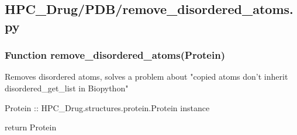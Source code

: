 

\subsection{HPC\_Drug/PDB/remove\_disordered\_atoms.py}

    \subsubsection{Function remove\_disordered\_atoms(Protein)}

        Removes disordered atoms, solves a problem about "copied atoms don't inherit disordered\_get\_list in Biopython"

        Protein :: HPC\_Drug.structures.protein.Protein instance

        return Protein